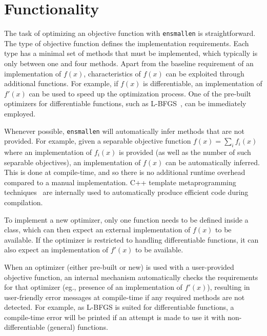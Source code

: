 \documentclass[twoside,11pt]{article}
\begin{document}
\section{Functionality}

The task of optimizing an objective function with {\tt ensmallen} is straightforward.
The type of objective function defines the implementation requirements.
Each type has a minimal set of methods that must be implemented,
which typically is only between one and four methods.
Apart from the baseline requirement of an implementation of $f(x)$,
characteristics of $f(x)$ can be exploited through additional functions.
For example, if $f(x)$ is differentiable,
an implementation of $f'(x)$ can be used to speed up the optimization process.
One of the pre-built optimizers for differentiable functions,
such as L-BFGS~\citep{liu1989limited},
can be immediately employed.

Whenever possible, {\tt ensmallen} will automatically infer methods
that are not provided.
For example, given a separable objective function
$f(x) = \sum_i f_i(x)$
where an implementation of $f_i(x)$ is provided
(as well as the number of such separable objectives),
an implementation of $f(x)$ can be automatically inferred.
This is done at compile-time, and so there is no additional runtime
overhead compared to a manual implementation.
C++ template metaprogramming techniques~\citep{Abrahams_2004,alexandrescu2001modern}
are internally used to automatically produce efficient code during compilation.

To implement a new optimizer,
only one function needs to be defined inside a class,
which can then expect an external implementation of $f(x)$ to be available.
If the optimizer is restricted to handling differentiable functions,
it can also expect an implementation of $f'(x)$ to be available.

When an optimizer (either pre-built or new) is used with a user-provided objective function,
an internal mechanism automatically checks the requirements for that optimizer
(eg., presence of an implementation of $f'(x)$),
resulting in user-friendly error messages at compile-time
if any required methods are not detected.
For example, as L-BFGS is suited for differentiable functions,
a compile-time error will be printed if an attempt is made
to use it with non-differentiable (general) functions.
\end{document}
